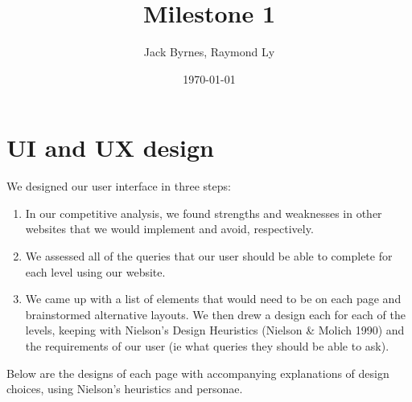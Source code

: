 \documentclass[12pt, a4paper]{article}
\title{Milestone 1}
\author{Jack Byrnes, Raymond Ly}
\date{\today}
\begin{document}
\maketitle
\tableofcontents
\section{UI and UX design}
We designed our user interface in three steps:
\begin{enumerate}
\item In our competitive analysis, we found strengths and weaknesses in other websites that we would implement and avoid, respectively. 
\item We assessed all of the queries that our user should be able to complete for each level using our website.
\item We came up with a list of elements that would need to be on each page and brainstormed alternative layouts. We then drew a design each for each of the levels, keeping with Nielson's Design Heuristics (Nielson \& Molich 1990) and the requirements of our user (ie what queries they should be able to ask).
\end{enumerate}
Below are the designs of each page with accompanying explanations of design choices, using Nielson's heuristics and personae.
\end{document}
